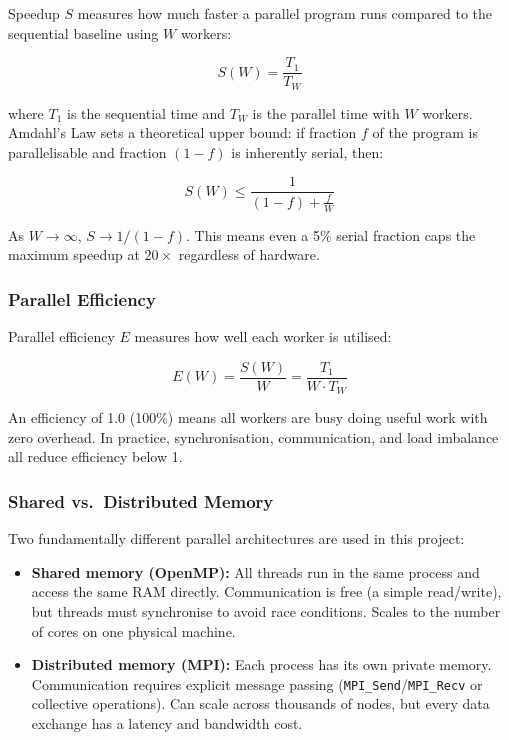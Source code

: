 ﻿\documentclass[12pt,a4paper]{article}
\begin{document}
Speedup $S$ measures how much faster a parallel program runs compared to
the sequential baseline using $W$ workers:

\begin{equation}
    S(W) = \frac{T_1}{T_W}
\end{equation}

\noindent where $T_1$ is the sequential time and $T_W$ is the parallel time
with $W$ workers. Amdahl's Law sets a theoretical upper bound: if fraction
$f$ of the program is parallelisable and fraction $(1-f)$ is inherently
serial, then:

\begin{equation}
    S(W) \leq \frac{1}{(1-f) + \frac{f}{W}}
\end{equation}

As $W \to \infty$, $S \to 1/(1-f)$. This means even a 5\% serial fraction
caps the maximum speedup at $20\times$ regardless of hardware.

\subsubsection*{Parallel Efficiency}

Parallel efficiency $E$ measures how well each worker is utilised:

\begin{equation}
    E(W) = \frac{S(W)}{W} = \frac{T_1}{W \cdot T_W}
\end{equation}

An efficiency of 1.0 (100\%) means all workers are busy doing useful work
with zero overhead. In practice, synchronisation, communication, and load
imbalance all reduce efficiency below 1.

\subsubsection*{Shared vs.\ Distributed Memory}

Two fundamentally different parallel architectures are used in this project:

\begin{itemize}
    \item \textbf{Shared memory (OpenMP):} All threads run in the same process
          and access the same RAM directly. Communication is free (a simple
          read/write), but threads must synchronise to avoid race conditions.
          Scales to the number of cores on one physical machine.

    \item \textbf{Distributed memory (MPI):} Each process has its own private
          memory. Communication requires explicit message passing
          (\texttt{MPI\_Send}/\texttt{MPI\_Recv} or collective operations).
          Can scale across thousands of nodes, but every data exchange has a
          latency and bandwidth cost.
\end{itemize}
\end{document}
